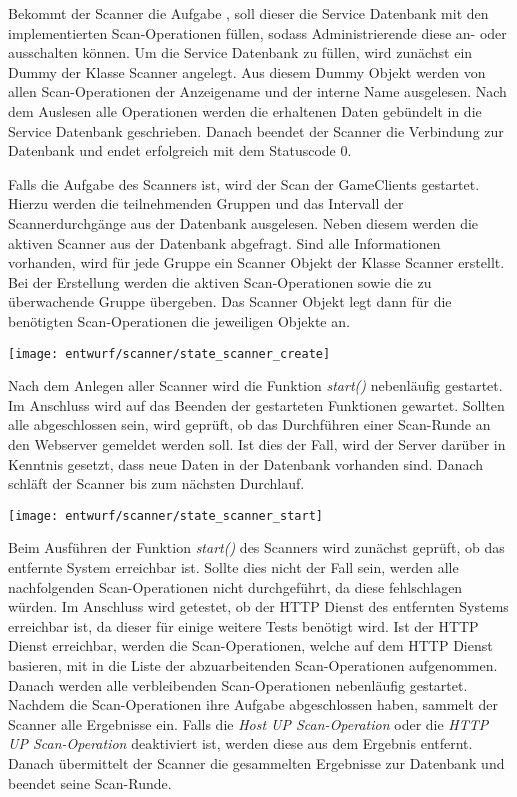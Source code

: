 Bekommt der Scanner die Aufgabe , soll dieser die Service Datenbank mit den implementierten Scan-Operationen füllen, sodass Administrierende diese an- oder ausschalten können. Um die Service Datenbank zu füllen, wird zunächst ein Dummy der Klasse Scanner angelegt. Aus diesem Dummy Objekt werden von allen Scan-Operationen der Anzeigename und der interne Name ausgelesen. Nach dem Auslesen alle Operationen werden die erhaltenen Daten gebündelt in die Service Datenbank geschrieben. Danach beendet der Scanner die Verbindung zur Datenbank und endet erfolgreich mit dem Statuscode 0.

Falls die Aufgabe des Scanners  ist, wird der Scan der GameClients gestartet. Hierzu werden die teilnehmenden Gruppen und das Intervall der Scannerdurchgänge aus der Datenbank ausgelesen. Neben diesem werden die aktiven Scanner aus der Datenbank abgefragt. Sind alle Informationen vorhanden, wird für jede Gruppe ein Scanner Objekt der Klasse Scanner erstellt. Bei der Erstellung werden die aktiven Scan-Operationen sowie die zu überwachende Gruppe übergeben. Das Scanner Objekt legt dann für die benötigten Scan-Operationen die jeweiligen Objekte an.

\begin{center}
	\texttt{[image: entwurf/scanner/state\_scanner\_create]}
	\label{fig:scanner-create-state}
\end{center}

Nach dem Anlegen aller Scanner wird die Funktion \textit{start()} nebenläufig gestartet. Im Anschluss wird auf das Beenden der gestarteten Funktionen gewartet. Sollten alle abgeschlossen sein, wird geprüft, ob das Durchführen einer Scan-Runde an den Webserver gemeldet werden soll. Ist dies der Fall, wird der Server darüber in Kenntnis gesetzt, dass neue Daten in der Datenbank vorhanden sind. Danach schläft der Scanner bis zum nächsten Durchlauf.

\begin{center}
	\texttt{[image: entwurf/scanner/state\_scanner\_start]}
\end{center}

Beim Ausführen der Funktion \textit{start()} des Scanners wird zunächst geprüft, ob das entfernte System erreichbar ist. Sollte dies nicht der Fall sein, werden alle nachfolgenden Scan-Operationen nicht durchgeführt, da diese fehlschlagen würden. Im Anschluss wird getestet, ob der HTTP Dienst des entfernten Systems erreichbar ist, da dieser für einige weitere Tests benötigt wird. Ist der HTTP Dienst erreichbar, werden die Scan-Operationen, welche auf dem HTTP Dienst basieren, mit in die Liste der abzuarbeitenden Scan-Operationen aufgenommen. Danach werden alle verbleibenden Scan-Operationen nebenläufig gestartet. Nachdem die Scan-Operationen ihre Aufgabe abgeschlossen haben, sammelt der Scanner alle Ergebnisse ein. Falls die \textit{Host UP Scan-Operation} oder die \textit{HTTP UP Scan-Operation} deaktiviert ist, werden diese aus dem Ergebnis entfernt. Danach übermittelt der Scanner die gesammelten Ergebnisse zur Datenbank und beendet seine Scan-Runde.

